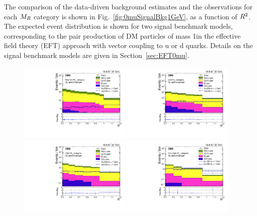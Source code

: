 The comparison of the data-driven background estimates and the observations for
each $M_R$ category is shown in Fig.~\ref{fig:0muSignalBkg1GeV}, as a function of $R^2$. 
The expected event distribution is shown for two signal
benchmark models, corresponding to the pair production of DM particles
of mass 1\GeV in the effective field theory (EFT) approach with vector coupling to u or d quarks. 
Details on the signal benchmark models are given in Section~\ref{sec:EFT0mu}.
\begin{figure}
 \centering
   \includegraphics[width=0.48\textwidth]{SignalBkgPlots/Data_MC_cat1_1_DoubleSignal_V.pdf}
   \includegraphics[width=0.48\textwidth]{SignalBkgPlots/Data_MC_cat2_1_DoubleSignal_V.pdf}
   \includegraphics[width=0.48\textwidth]{SignalBkgPlots/Data_MC_cat3_1_DoubleSignal_V.pdf}
   \includegraphics[width=0.48\textwidth]{SignalBkgPlots/Data_MC_cat4_1_DoubleSignal_V.pdf}

\end{figure}
